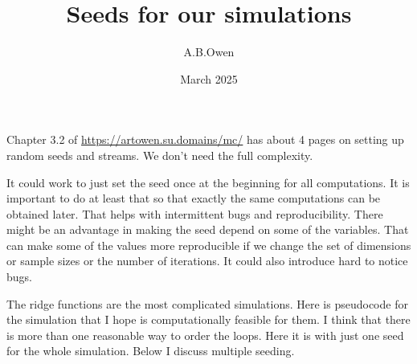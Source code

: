 \documentclass{article}
\title{Seeds for our simulations}
\date{March 2025}
\author{A.B.Owen}
\begin{document}
\maketitle

Chapter 3.2 of \url{https://artowen.su.domains/mc/}
has about 4 pages on setting up random seeds and streams.
We don't need the full complexity.

It could work to just set the seed once at the beginning
for all computations.  It is important to do at least that
so that exactly the same computations can be obtained
later. That helps with intermittent bugs and reproducibility.
There might be an
advantage in making the seed depend on some of the
variables.  That can make some of the values more
reproducible if we change the set of dimensions or sample
sizes or the number of iterations.  It could also introduce
hard to notice bugs.

\medskip
The ridge functions are the most complicated
simulations. Here is pseudocode for the simulation that I hope is computationally
feasible for them.  I think that there is more than one reasonable way
to order the loops.  Here it is with just one seed for the whole simulation.
Below I discuss multiple seeding.
\medskip
\end{document}
